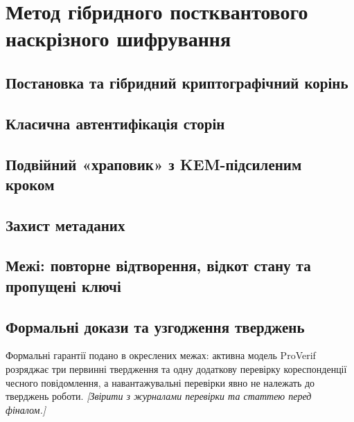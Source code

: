 \chapter{Метод гібридного постквантового наскрізного шифрування}
\label{ch:e2ee}


\section{Постановка та гібридний криптографічний корінь}
\label{sec:e2ee-root}

\section{Класична автентифікація сторін}
\label{sec:e2ee-auth}

\section{Подвійний «храповик» з KEM-підсиленим кроком}
\label{sec:e2ee-ratchet}

\section{Захист метаданих}
\label{sec:e2ee-metadata}

\section{Межі: повторне відтворення, відкот стану та пропущені ключі}
\label{sec:e2ee-limits}

\section{Формальні докази та узгодження тверджень}
\label{sec:e2ee-formal}
Формальні гарантії подано в окреслених межах: активна модель ProVerif розряджає три первинні твердження та одну додаткову перевірку кореспонденції чесного повідомлення, а навантажувальні перевірки явно не належать до тверджень роботи. \emph{[Звірити з журналами перевірки та статтею перед фіналом.]}

